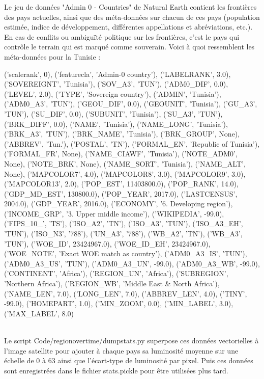 \documentclass[a4paper, 11pt]{report}
\begin{document}
Le jeu de données "Admin 0 - Countries" de Natural Earth \cite{naturalearthdata} contient les frontières des pays actuelles, ainsi que des méta-données sur chacun de ces pays (population estimée, indice de développement, différentes appellations et abréviations, etc.). En cas de conflits ou ambiguïté politique sur les frontières, c'est le pays qui contrôle le terrain qui est marqué comme souverain. Voici à quoi ressemblent les méta-données pour la Tunisie :\\
\begin{minipage}[t]{1.0\textwidth}
			{('scalerank', 0), ('featurecla', 'Admin-0 country'), ('LABELRANK', 3.0), ('SOVEREIGNT', 'Tunisia'), ('SOV\_A3', 'TUN'), ('ADM0\_DIF', 0.0), ('LEVEL', 2.0), ('TYPE', 'Sovereign country'), ('ADMIN', 'Tunisia'), ('ADM0\_A3', 'TUN'), ('GEOU\_DIF', 0.0), ('GEOUNIT', 'Tunisia'), ('GU\_A3', 'TUN'), ('SU\_DIF', 0.0), ('SUBUNIT', 'Tunisia'), ('SU\_A3', 'TUN'), ('BRK\_DIFF', 0.0), ('NAME', 'Tunisia'), ('NAME\_LONG', 'Tunisia'), ('BRK\_A3', 'TUN'), ('BRK\_NAME', 'Tunisia'), ('BRK\_GROUP', None), ('ABBREV', 'Tun.'), ('POSTAL', 'TN'), ('FORMAL\_EN', 'Republic of Tunisia'), ('FORMAL\_FR', None), ('NAME\_CIAWF', 'Tunisia'), ('NOTE\_ADM0', None), ('NOTE\_BRK', None), ('NAME\_SORT', 'Tunisia'), ('NAME\_ALT', None), ('MAPCOLOR7', 4.0), ('MAPCOLOR8', 3.0), ('MAPCOLOR9', 3.0), ('MAPCOLOR13', 2.0), ('POP\_EST', 11403800.0), ('POP\_RANK', 14.0), ('GDP\_MD\_EST', 130800.0), ('POP\_YEAR', 2017.0), ('LASTCENSUS', 2004.0), ('GDP\_YEAR', 2016.0), ('ECONOMY', '6. Developing region'), ('INCOME\_GRP', '3. Upper middle income'), ('WIKIPEDIA', -99.0), ('FIPS\_10\_', 'TS'), ('ISO\_A2', 'TN'), ('ISO\_A3', 'TUN'), ('ISO\_A3\_EH', 'TUN'), ('ISO\_N3', '788'), ('UN\_A3', '788'), ('WB\_A2', 'TN'), ('WB\_A3', 'TUN'), ('WOE\_ID', 23424967.0), ('WOE\_ID\_EH', 23424967.0), ('WOE\_NOTE', 'Exact WOE match as country'), ('ADM0\_A3\_IS', 'TUN'), ('ADM0\_A3\_US', 'TUN'), ('ADM0\_A3\_UN', -99.0), ('ADM0\_A3\_WB', -99.0),	 ('CONTINENT', 'Africa'), ('REGION\_UN', 'Africa'), ('SUBREGION', 'Northern Africa'), ('REGION\_WB', 'Middle East \& North Africa'), ('NAME\_LEN', 7.0), ('LONG\_LEN', 7.0), ('ABBREV\_LEN', 4.0), ('TINY', -99.0), ('HOMEPART', 1.0), ('MIN\_ZOOM', 0.0), ('MIN\_LABEL', 3.0), ('MAX\_LABEL', 8.0)}
\end{minipage}\\

Le script Code/regionovertime/dumpstats.py superpose ces données vectorielles à l'image satellite pour ajouter à chaque pays sa luminosité moyenne sur une échelle de 0 à 63 ainsi que l'écart-type de luminosité par pixel. Puis ces données sont enregistrées dans le fichier stats.pickle pour être utilisées plus tard.
\end{document}
